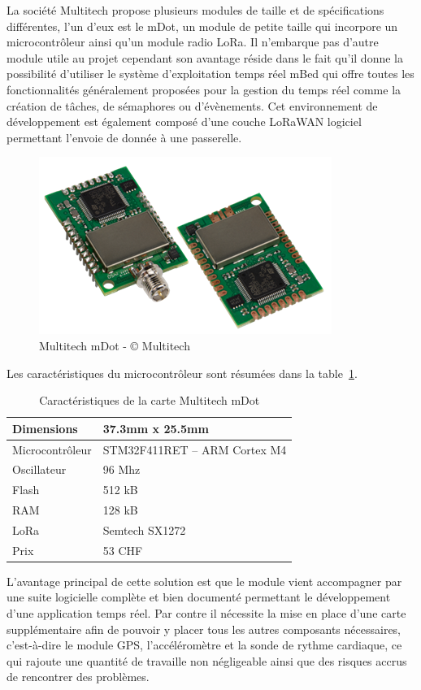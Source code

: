 La société Multitech propose plusieurs modules de taille et de spécifications différentes, l’un d’eux est le mDot, un module de petite taille qui incorpore un microcontrôleur ainsi qu’un module radio LoRa. Il n’embarque pas d’autre module utile au projet cependant son avantage réside dans le fait qu’il donne la possibilité d’utiliser le système d’exploitation temps réel mBed qui offre toutes les fonctionnalités généralement proposées pour la gestion du temps réel comme la création de tâches, de sémaphores ou d’évènements. Cet environnement de développement est également composé d’une couche LoRaWAN logiciel permettant l’envoie de donnée à une passerelle.

\begin{figure}[htb]
\centering 
\includegraphics[width=0.5\columnwidth]{../images/Multitech-mDot.png} 
\caption[Multitech mDot]{Multitech mDot - © Multitech}
\label{fig:multitech_mdot}
\end{figure}

Les caractéristiques du microcontrôleur sont résumées dans la table~\ref{tab:multitech_mdot_cara}.

\begin{table}[htb]
\caption[Multitech mDot Caractéristiques]{Caractéristiques de la carte Multitech mDot}
\label{tab:multitech_mdot_cara}
\centering
\begin{tabular}{ l | l }
\toprule
Dimensions & 37.3mm x 25.5mm \\
\midrule
Microcontrôleur & STM32F411RET – ARM Cortex M4 \\
\midrule
Oscillateur & 96 Mhz \\
\midrule
Flash & 512 kB \\
\midrule
RAM & 128 kB \\
\midrule
LoRa & Semtech SX1272 \\
\midrule
Prix & 53 CHF\\
\bottomrule 
\end{tabular}
\end{table}

L’avantage principal de cette solution est que le module vient accompagner par une suite logicielle complète et bien documenté permettant le développement d’une application temps réel. Par contre il nécessite la mise en place d’une carte supplémentaire afin de pouvoir y placer tous les autres composants nécessaires, c’est-à-dire le module GPS, l’accéléromètre et la sonde de rythme cardiaque, ce qui rajoute une quantité de travaille non négligeable ainsi que des risques accrus de rencontrer des problèmes.

